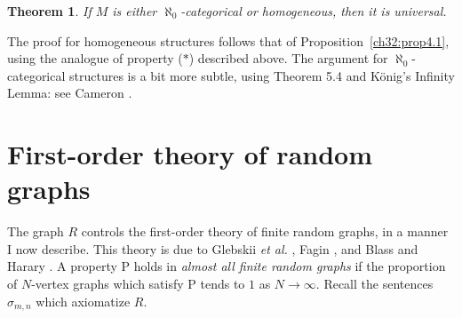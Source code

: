 \documentclass[12pt]{article}
\newtheorem{theorem}{Theorem}
\begin{document}
\begin{theorem}\label{ch32:them5.3} 
If $M$ is either $\aleph_0$-categorical or homogeneous, then it is universal.
\end{theorem}

The proof for homogeneous structures follows that of
Proposition~\ref{ch32:prop4.1}, using the analogue of property
($\ast$) described above. The argument for $\aleph_0$-categorical
structures is a bit more subtle, using Theorem 5.4 and K\"{o}nig's
Infinity Lemma: see Cameron \cite{ch32:bib7}.

\section{First-order theory of random graphs}%
\label{ch32:sec2.6}

The graph $R$ controls the first-order theory of finite random
graphs, in a manner I now describe. This theory is due to Glebskii
{\it et al.} \cite{ch32:bib24}, Fagin \cite{ch32:bib20}, and
Blass and Harary \cite{ch32:bib2}. A property P holds in
\emph{almost all finite random graphs} if the proportion of
$N$-vertex graphs which satisfy P tends to $1$ as $N \rightarrow
\infty$. Recall the sentences $\sigma_{m,n}$ which axiomatize $R$.
\end{document}
